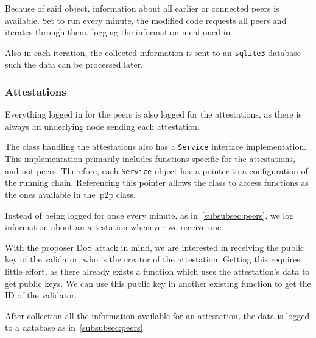 Because of said object, information about all earlier or connected peers is available.
Set to run every minute, the modified code requests all peers and iterates through them,
logging the information mentioned in~.


Also in each iteration,
the collected information is sent to an \texttt{sqlite3} database such the data can be processed later.

\subsubsection{Attestations}\label{subsubsec:attestations}
Everything logged in for the peers is also logged for the attestations,
as there is always an underlying node sending each attestation.

The class handling the attestations also has a \texttt{Service} interface implementation.
This implementation primarily includes functions specific for the attestations, and not peers.
Therefore, each \texttt{Service} object has a pointer to a configuration of the running chain.
Referencing this pointer allows the class to access functions as the ones available in the~\gls{p2p} class.

Instead of being logged for once every minute, as in~\autoref{subsubsec:peers},
we log information about an attestation whenever we receive one.

With the proposer DoS attack in mind, we are interested in receiving the public key of the validator,
who is the creator of the attestation.
Getting this requires little effort,
as there already exists a function which uses the attestation's data to get public keys.
We can use this public key in another existing function to get the ID of the validator.

After collection all the information available for an attestation,
the data is logged to a database as in~\autoref{subsubsec:peers}.